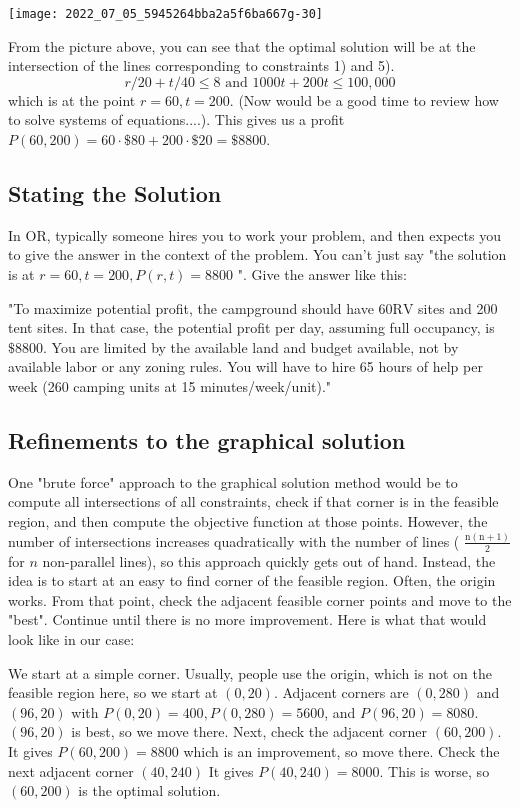 \texttt{[image: 2022\_07\_05\_5945264bba2a5f6ba667g-30]}

From the picture above, you can see that the optimal solution will be at the intersection of the lines corresponding to constraints 1) and 5).
$$
r / 20+t / 40 \leq 8 \text { and } 1000 t+200 t \leq 100,000
$$
which is at the point $r=60, t=200$. (Now would be a good time to review how to solve systems of equations....). This gives us a profit $P(60,200)=60 \cdot \$ 80+200 \cdot \$ 20=\$ 8800$.

\subsection{Stating the Solution}
In OR, typically someone hires you to work your problem, and then expects you to give the answer in the context of the problem. You can't just say "the solution is at $r=60, t=200, P(r, t)=8800$ ". Give the answer like this:

"To maximize potential profit, the campground should have $60 \mathrm{RV}$ sites and 200 tent sites. In that case, the potential profit per day, assuming full occupancy, is $\$ 8800$. You are limited by the available land and budget available, not by available labor or any zoning rules. You will have to hire 65 hours of help per week (260 camping units at 15 minutes/week/unit)."

\subsection{Refinements to the graphical solution}
One "brute force" approach to the graphical solution method would be to compute all intersections of all constraints, check if that corner is in the feasible region, and then compute the objective function at those points. However, the number of intersections increases quadratically with the number of lines ( $\frac{\mathrm{n}(\mathrm{n}+1)}{2}$ for $n$ non-parallel lines), so this approach quickly gets out of hand. Instead, the idea is to start at an easy to find corner of the feasible region. Often, the origin works. From that point, check the adjacent feasible corner points and move to the "best". Continue until there is no more improvement. Here is what that would look like in our case:

We start at a simple corner. Usually, people use the origin, which is not on the feasible region here, so we start at $(0,20)$. Adjacent corners are $(0,280)$ and $(96,20)$ with $P(0,20)=400, P(0,280)=5600$, and $P(96,20)=8080$. $(96,20)$ is best, so we move there. Next, check the adjacent corner $(60,200)$. It gives $P(60,200)=8800$ which is an improvement, so move there. Check the next adjacent corner $(40,240)$ It gives $P(40,240)=8000$. This is worse, so $(60,200)$ is the optimal solution.\\

